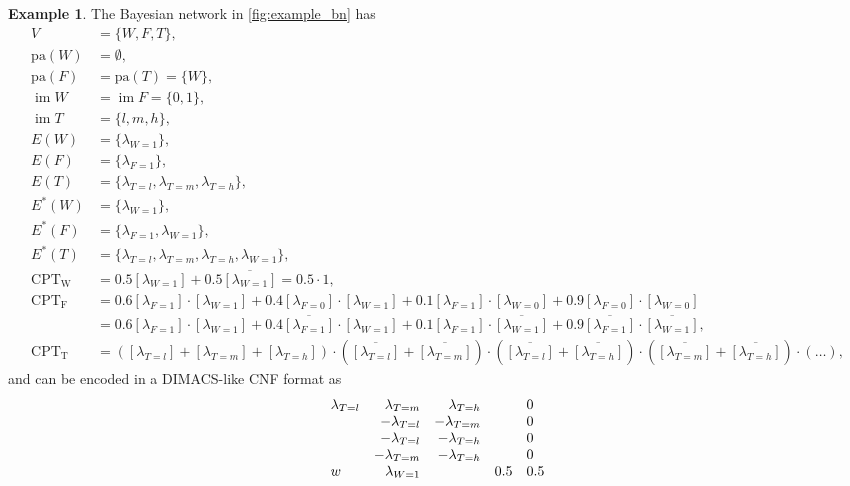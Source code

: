 \documentclass{article}
\theoremstyle{definition}
\newtheorem{example}{Example}
\theoremstyle{remark}
\DeclareMathOperator{\im}{im}
\begin{document}
\begin{example}
  The Bayesian network in \cref{fig:example_bn} has
  \begin{align*}
    V &= \{ W, F, T \}, \\
    \mathrm{pa}(W) &= \emptyset, \\
    \mathrm{pa}(F) &= \mathrm{pa}(T) = \{ W \}, \\
    \im W &= \im F = \{ 0, 1 \}, \\
    \im T &= \{ l, m, h \}, \\
    E(W) &= \{ \lambda_{W=1} \}, \\
    E(F) &= \{ \lambda_{F=1} \}, \\
    E(T) &= \{ \lambda_{T=l}, \lambda_{T=m}, \lambda_{T=h} \}, \\
    E^*(W) &= \{ \lambda_{W=1} \}, \\
    E^*(F) &= \{ \lambda_{F=1}, \lambda_{W=1} \}, \\
    E^*(T) &= \{ \lambda_{T=l}, \lambda_{T=m}, \lambda_{T=h}, \lambda_{W=1} \}, \\
    \mathrm{CPT_W} &= 0.5[\lambda_{W=1}]+0.5\overline{[\lambda_{W=1}]} = 0.5 \cdot 1, \\
    \mathrm{CPT_F} &= 0.6[\lambda_{F=1}] \cdot [\lambda_{W=1}] + 0.4[\lambda_{F=0}] \cdot [\lambda_{W=1}] + 0.1[\lambda_{F=1}] \cdot [\lambda_{W=0}] + 0.9[\lambda_{F=0}] \cdot [\lambda_{W=0}] \\
      &= 0.6[\lambda_{F=1}] \cdot [\lambda_{W=1}] + 0.4\overline{[\lambda_{F=1}]} \cdot [\lambda_{W=1}] + 0.1[\lambda_{F=1}] \cdot \overline{[\lambda_{W=1}]} + 0.9\overline{[\lambda_{F=1}]} \cdot \overline{[\lambda_{W=1}]}, \\
    \mathrm{CPT_T} &= ([\lambda_{T=l}] + [\lambda_{T=m}] + [\lambda_{T=h}]) \cdot (\overline{[\lambda_{T=l}]} + \overline{[\lambda_{T=m}]}) \cdot (\overline{[\lambda_{T=l}]} + \overline{[\lambda_{T=h}]}) \cdot (\overline{[\lambda_{T=m}]} + \overline{[\lambda_{T=h}]}) \cdot (\dots),
  \end{align*}
  and can be encoded in a DIMACS-like CNF format as
  \[
    \begin{array}{l r r l l}
      \lambda\sb{T=l} &\lambda\sb{T=m} &\lambda\sb{T=h} & &0 \\
                      &-\lambda\sb{T=l} &-\lambda\sb{T=m} & &0 \\
                      &-\lambda\sb{T=l} &-\lambda\sb{T=h} & &0 \\
                      &-\lambda\sb{T=m} &-\lambda\sb{T=h} & &0 \\
      w &\lambda\sb{W=1} & &0.5 &0.5 \\

\end{array}\]
\end{example}
\end{document}
